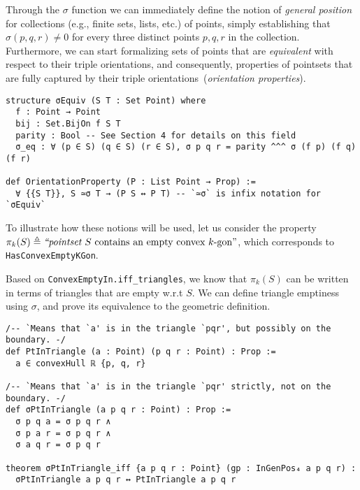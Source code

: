 Through the $\sigma$ function we can immediately define the notion of \emph{general position} for collections (e.g., finite sets, lists, etc.) of points, simply establishing that $\sigma(p, q, r) \neq 0$ for every three distinct points $p, q, r$ in the collection.
Furthermore, we can start formalizing sets of points that are \emph{equivalent} with respect to their triple orientations, and consequently, properties of pointsets that are fully captured by their triple orientations~(\emph{orientation properties}).
% 
\begin{lstlisting}
structure σEquiv (S T : Set Point) where
  f : Point → Point
  bij : Set.BijOn f S T
  parity : Bool -- See Section 4 for details on this field
  σ_eq : ∀ (p ∈ S) (q ∈ S) (r ∈ S), σ p q r = parity ^^^ σ (f p) (f q) (f r)

def OrientationProperty (P : List Point → Prop) :=
  ∀ {{S T}}, S ≃σ T → (P S ↔ P T) -- `≃σ` is infix notation for `σEquiv`
\end{lstlisting}

To illustrate how these notions will be used, let us consider the property
\(
  \pi_k(S) \triangleq \text{\em ``pointset } S \text{ contains an empty convex } k\text{-gon''}
\),  which corresponds to \lstinline|HasConvexEmptyKGon|.

Based on \lstinline|ConvexEmptyIn.iff_triangles|, we know that $\pi_k(S)$ can be written in terms of triangles that are empty w.r.t $S$. We can define triangle emptiness using $\sigma$, and prove its equivalence to the geometric definition.
\begin{lstlisting}
/-- `Means that `a' is in the triangle `pqr', but possibly on the boundary. -/
def PtInTriangle (a : Point) (p q r : Point) : Prop :=
  a ∈ convexHull ℝ {p, q, r}

/-- `Means that `a' is in the triangle `pqr' strictly, not on the boundary. -/
def σPtInTriangle (a p q r : Point) : Prop :=
  σ p q a = σ p q r ∧
  σ p a r = σ p q r ∧
  σ a q r = σ p q r

theorem σPtInTriangle_iff {a p q r : Point} (gp : InGenPos₄ a p q r) :
  σPtInTriangle a p q r ↔ PtInTriangle a p q r
\end{lstlisting}



